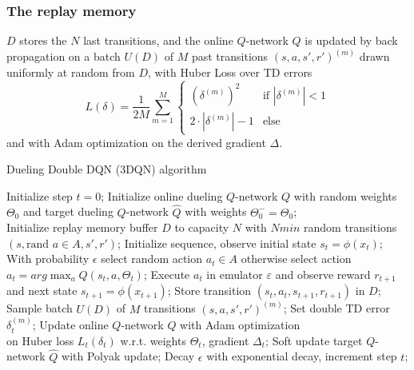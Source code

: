 \documentclass[journal]{IEEEtran}
\begin{document}
\subsubsection{The replay memory} $D$ stores the $N$ last transitions, and the online $Q$-network $Q$ is updated by back propagation on a batch $U(D)$ of $M$ past transitions $(s,a,s',r')^{(m)}$ drawn uniformly at random from $D$, with Huber Loss over TD errors
\[ 
L(\delta) = \frac{1}{2M}\sum_{m=1}^M
\begin{cases}
  (\delta^{(m)})^2 & \text{if } |\delta^{(m)}| < 1 \\
  2 \cdot |\delta^{(m)}| - 1 & \text{else}
\end{cases}
\]
and with Adam optimization \cite{kingma2017adam} on the derived gradient $\Delta$.

\begin{algorithm}[H]
\caption*{Dueling Double DQN (3DQN) algorithm}
\begin{algorithmic}
    \STATE Initialize step $t = 0$;
    \STATE Initialize online dueling $Q$-network $Q$ with random weights $\Theta_0$ and target dueling $Q$-network $\widehat{Q}$ with weights $\Theta^-_0 = \Theta_0$; \\
    \STATE Initialize replay memory buffer $D$ to capacity $N$
    \STATE with $Nmin$ random transitions $(s,\text{rand }a \in A,s',r')$;
        \bindent
        \STATE Initialize sequence, observe initial state $s_t=\phi(x_t)$;
            \bindent
            \STATE With probability $\epsilon$ select random action $a_t \in A$
            \STATE otherwise select action $a_t = arg\max_{a}Q(s_t,a,\Theta_t)$;
            \STATE Execute $a_t$ in emulator $\varepsilon$ and
            \STATE observe reward $r_{t+1}$ and next state $s_{t+1}=\phi(x_{t+1})$;
            \STATE Store transition $(s_t,a_t,s_{t+1},r_{t+1})$ in $D$;
            \STATE Sample batch $U(D)$ of $M$ transitions $(s,a,s',r')^{(m)}$;
                \bindent
                \STATE Set double TD error $\delta^{(m)}_t$;
                \eindent
            \ENDFOR
            \STATE Update online $Q$-network $Q$ with Adam optimization \\
            on Huber loss $L_t(\delta_t)$ w.r.t. weights $\Theta_t$, gradient $\Delta_t$;
            \STATE Soft update target $Q$-network $\widehat{Q}$ with Polyak update;
            \STATE Decay $\epsilon$ with exponential decay, increment step $t$;
            \eindent
        \ENDWHILE
        \eindent
    \ENDFOR
\end{algorithmic}
\end{algorithm}
\end{document}
